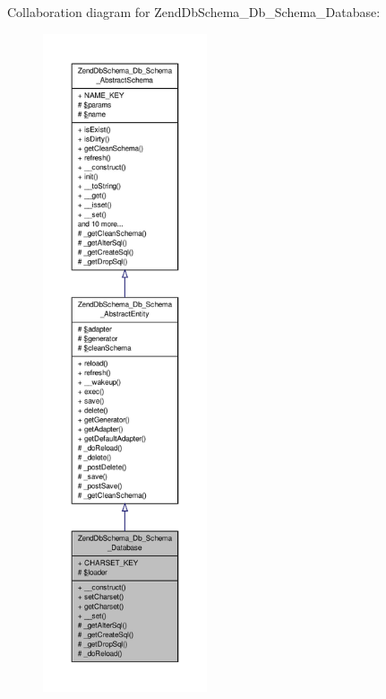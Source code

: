 Collaboration diagram for Zend\-Db\-Schema\-\_\-\-Db\-\_\-\-Schema\-\_\-\-Database\-:\nopagebreak
\begin{figure}[H]
\begin{center}
\leavevmode
\includegraphics[height=550pt]{classZendDbSchema__Db__Schema__Database__coll__graph}
\end{center}
\end{figure}

